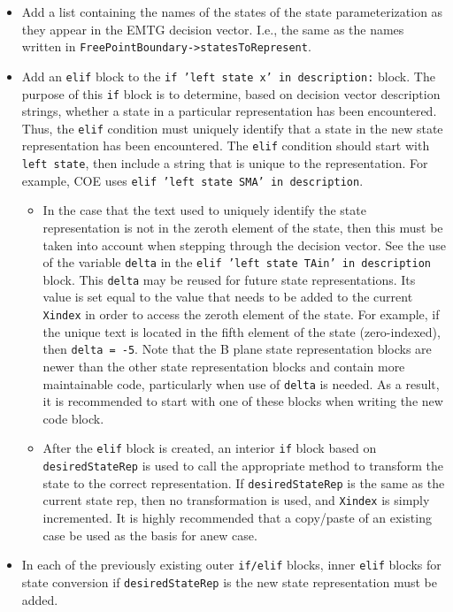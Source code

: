 \documentclass[11pt]{article}
\begin{document}
\begin{itemize}
	\item Add a list containing the names of the states of the state parameterization as they appear in the \ac{EMTG} decision vector. I.e., the same as the names written in \texttt{FreePointBoundary->statesToRepresent}.
	\item Add an \texttt{elif} block to the \texttt{if 'left state x' in description:} block. The purpose of this \texttt{if} block is to determine, based on decision vector description strings, whether a state in a particular representation has been encountered. Thus, the \texttt{elif} condition must uniquely identify that a state in the new state representation has been encountered. The \texttt{elif} condition should start with \texttt{left state}, then include a string that is unique to the representation. For example, COE uses \texttt{elif 'left state SMA' in description}.
	\begin{itemize}
		\item In the case that the text used to uniquely identify the state representation is not in the zeroth element of the state, then this must be taken into account when stepping through the decision vector. See the use of the variable \texttt{delta} in the \texttt{elif 'left state TAin' in description} block. This \texttt{delta} may be reused for future state representations. Its value is set equal to the value that needs to be added to the current \texttt{Xindex} in order to access the zeroth element of the state. For example, if the unique text is located in the fifth element of the state (zero-indexed), then \texttt{delta = -5}. Note that the B plane state representation blocks are newer than the other state representation blocks and contain more maintainable code, particularly when use of \texttt{delta} is needed. As a result, it is recommended to start with one of these blocks when writing the new code block.
		\item After the \texttt{elif} block is created, an interior \texttt{if} block based on \texttt{desiredStateRep} is used to call the appropriate method to transform the state to the correct representation. If \texttt{desiredStateRep} is the same as the current state rep, then no transformation is used, and \texttt{Xindex} is simply incremented. It is highly recommended that a copy/paste of an existing case be used as the basis for anew case.
	\end{itemize}
	\item In each of the previously existing outer \texttt{if/elif} blocks, inner \texttt{elif} blocks for state conversion if \texttt{desiredStateRep} is the new state representation must be added.
\end{itemize}
\end{document}
